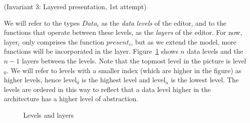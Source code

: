 {\centering (Invariant 3: Layered presentation, 1st attempt)\\}\vspace{1em} 

We will refer to the types $Data_i$ as the {\em data levels} of the editor, and to the functions that operate between these levels, as the {\em layers} of the editor. For now, layer$_i$ only comprises the function $present_i$, but as we extend the model, more functions will be incorporated in the layer. Figure~\ref{levelsandlayers} shows $n$ data levels and the $n-1$ layers between the levels. Note that the topmost level in the picture is level$_0$. We will refer to levels with a smaller index (which are higher in the figure) as higher levels, hence level$_0$ is the highest level and level$_n$ is the lowest level. The levels are ordered in this way to reflect that a data level higher in the architecture has a higher level of abstraction. 
\begin{figure}
\begin{small}
\begin{center}
\begin{center}
\begin{small}
\bigskip \noindent
{}
\end{small}
\end{center}\caption{Levels and layers}\label{levelsandlayers} 
\end{center}
\end{small}
\end{figure}


